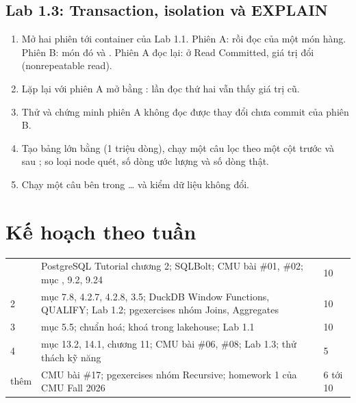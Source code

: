 
\subsection{Lab 1.3: Transaction, isolation và EXPLAIN}

\begin{enumerate}
  \item Mở hai phiên  tới container của Lab 1.1. Phiên A:  rồi đọc  của một món hàng. Phiên B:  món đó và . Phiên A đọc lại: ở Read Committed, giá trị đổi (nonrepeatable read).
  \item Lặp lại với phiên A mở bằng : lần đọc thứ hai vẫn thấy giá trị cũ.
  \item Thử  và chứng minh phiên A không đọc được thay đổi chưa commit của phiên B.
  \item Tạo bảng lớn bằng  (1 triệu dòng), chạy  một câu lọc theo một cột trước và sau ; so loại node quét, số dòng ước lượng và số dòng thật.
  \item Chạy  một câu  bên trong  …  và kiểm dữ liệu không đổi.
\end{enumerate}


\section{Kế hoạch theo tuần}

\begin{xltabular}{\textwidth}{@{}P{1.4cm} L P{1.6cm}@{}}
\toprule
{} &  &  \\
\midrule
\endhead
\bottomrule
{} & PostgreSQL Tutorial chương 2; SQLBolt; CMU bài \#01, \#02; mục , 9.2, 9.24 & 10 \\
2 & mục 7.8, 4.2.7, 4.2.8, 3.5; DuckDB Window Functions, QUALIFY; Lab 1.2; pgexercises nhóm Joins, Aggregates & 10 \\
3 & mục 5.5; chuẩn hoá; khoá trong lakehouse; Lab 1.1 & 10 \\
4 & mục 13.2, 14.1, chương 11; CMU bài \#06, \#08; Lab 1.3; thử thách kỹ năng & 5 \\
thêm & CMU bài \#17; pgexercises nhóm Recursive; homework 1 của CMU Fall 2026 & 6 tới 10 \\
\end{xltabular}

